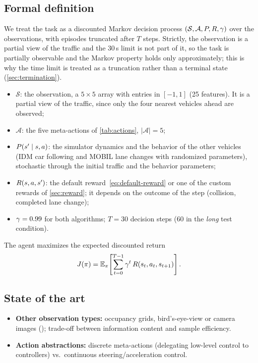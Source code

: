 \subsection{Formal definition}
We treat the task as a discounted Markov decision process $(\mathcal{S}, \mathcal{A}, P, R, \gamma)$ over the
observations, with episodes truncated after $T$ steps. Strictly, the observation is a partial view of the traffic and
the 30\,s limit is not part of it, so the task is partially observable and the Markov property holds only
approximately; this is why the time limit is treated as a truncation rather than a terminal state
(\cref{sec:termination}).
\begin{itemize}
  \item $\mathcal{S}$: the  observation, a $5 \times 5$ array with entries in $[-1, 1]$ (25
        features). It is a partial view of the traffic, since only the four nearest vehicles ahead are observed;
  \item $\mathcal{A}$: the five meta-actions of \cref{tab:actions}, $|\mathcal{A}| = 5$;
  \item $P(s' \mid s, a)$: the simulator dynamics and the behavior of the other vehicles (IDM car
        following and MOBIL lane changes with randomized parameters), stochastic through the initial traffic and the
        behavior parameters;
  \item $R(s, a, s')$: the default reward~\eqref{eq:default-reward} or one of the custom rewards of
        \cref{sec:reward}; it depends on the outcome of the step (collision, completed lane change);
  \item $\gamma = 0.99$ for both algorithms; $T = 30$ decision steps (60 in the \emph{long} test condition).
\end{itemize}
The agent maximizes the expected discounted return
\begin{equation}
  J(\pi) = \mathbb{E}_{\pi}\!\left[\sum_{t=0}^{T-1} \gamma^{t}\, R(s_t, a_t, s_{t+1})\right].
  \label{eq:return}
\end{equation}

\subsection{State of the art}\label{sec:sota-mdp}
\begin{itemize}
  \item \textbf{Other observation types:} occupancy grids, bird's-eye-view or camera images
        (\cite{highway-env,kiran2022drl}); trade-off between information content and sample efficiency.
  \item \textbf{Action abstractions:} discrete meta-actions (delegating low-level control to controllers)
        vs.\ continuous steering/acceleration control.
\end{itemize}
